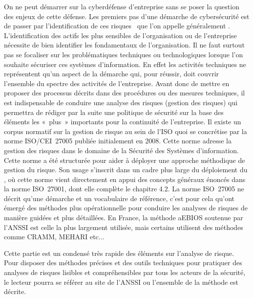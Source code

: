 On ne peut démarrer sur la cyberdéfense d’entreprise sans se poser la question des enjeux de cette défense. Les premiers pas d’une démarche de cybersécurité est de passer  par l’identification de ces risques  que l’on appelle généralement .
L’identification des actifs les plus sensibles de l’organisation ou de l’entreprise nécessite de bien identifier les fondamentaux de l’organisation.
Il ne faut surtout pas se focaliser sur les problématiques techniques ou technologiques lorsque l’on souhaite sécuriser ces systèmes d’information. En effet les activités techniques   ne représentent qu’un aspect de la  démarche qui, pour réussir, doit couvrir l’ensemble du spectre des  activités de l'entreprise.
Avant donc de mettre en proposer des processus décrits dans des procédures ou des mesures techniques, il est indispensable de conduire une analyse des risques (gestion des risques) qui permettra de rédiger par la suite une politique de sécurité sur la base des éléments les « plus » importants pour la continuité de l’entreprise.
Il existe un corpus normatif sur la gestion de risque au sein de l’ISO quoi se concrétise par la norme ISO/CEI~27005 publiée initialement en 2008. Cette norme adresse la gestion des risques dans le domaine de la Sécurité des Systèmes d'information.
Cette norme a été structurée pour aider à déployer une approche méthodique de gestion du risque. Son usage s’inscrit dans un cadre plus large du déploiement du ,  où cette norme vient directement en appui des concepts généraux énoncés dans la norme ISO~27001, dont elle complète le chapitre 4.2.
La norme ISO~27005 ne décrit qu'une démarche et un vocabulaire de référence, c’est pour cela qu’ont émergé des méthodes plus opérationnelle pour conduire les analyses de risques de manière guidées et plus détaillées. En France, la méthode \gls{aEBIOS} soutenue par l’ANSSI est celle la plus largement utilisée, mais certains utilisent des méthodes comme CRAMM, MEHARI etc...

Cette partie est un condensé très rapide des éléments sur l'analyse de risque. Pour disposer des méthodes précises et des outils techniques pour pratiquer des analyses de risques lisibles et compréhensibles par tous les acteurs de la sécurité, le lecteur pourra se référer au site de l’ANSSI ou l’ensemble de la méthode  est décrite.\\

